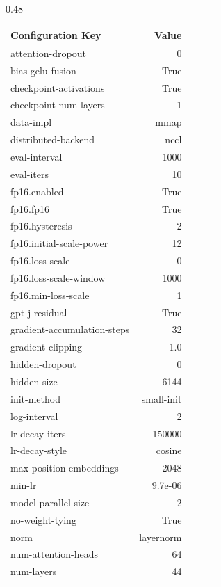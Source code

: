 \documentclass{article}
\begin{document}
\begin{table}[ht!]
\small
\centering
\begin{subtable}[h]{0.48\textwidth}
\begin{tabular}{lrrcc}
\hline
Configuration Key                               & Value \\
\hline
    attention-dropout & 0 \\
    bias-gelu-fusion & True \\
    checkpoint-activations & True \\
    checkpoint-num-layers & 1 \\
    data-impl & mmap \\
    distributed-backend & nccl \\
    eval-interval & 1000 \\
    eval-iters & 10 \\
    fp16.enabled & True \\
    fp16.fp16 & True \\
    fp16.hysteresis & 2 \\
    fp16.initial-scale-power & 12 \\
    fp16.loss-scale & 0 \\
    fp16.loss-scale-window & 1000 \\
    fp16.min-loss-scale & 1 \\
    gpt-j-residual & True \\
    gradient-accumulation-steps & 32 \\
    gradient-clipping & 1.0 \\
    hidden-dropout & 0 \\
    hidden-size & 6144 \\
    init-method & small-init \\
    log-interval & 2 \\
    lr-decay-iters & 150000 \\
    lr-decay-style & cosine \\
    max-position-embeddings & 2048 \\
    min-lr & 9.7e-06 \\
    model-parallel-size & 2 \\
    no-weight-tying & True \\
    norm & layernorm \\
    num-attention-heads & 64 \\
    num-layers & 44 \\
\end{tabular}


\end{subtable}
\end{table}
\end{document}
